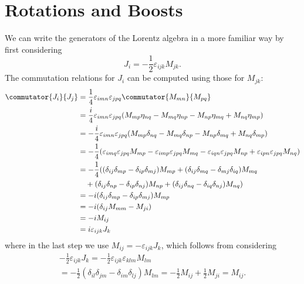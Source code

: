 \documentclass[fleqn]{NotesClass}
\newcommand{\minkowskiMetric}{\eta}
\begin{document}
    \section{Rotations and Boosts}
    We can write the generators of the Lorentz algebra in a more familiar way by first considering 
    \begin{equation}
        J_i = -\frac{1}{2}\varepsilon_{ijk}M_{jk}.
    \end{equation}
    The commutation relations for \(J_i\) can be computed using those for \(M_{jk}\):
    \begin{align}
        \commutator{J_i}{J_j} &= \frac{1}{4} \varepsilon_{imn}\varepsilon_{jpq} \commutator{M_{mn}}{M_{pq}}\\
        &= \frac{i}{4}\varepsilon_{imn}\varepsilon_{jpq} (M_{mp}\minkowskiMetric_{nq} - M_{mq}\minkowskiMetric_{np} - M_{np}\minkowskiMetric_{mq} + M_{nq}\minkowskiMetric_{mp})\\
        &= -\frac{i}{4}\varepsilon_{imn}\varepsilon_{jpq} (M_{mp}\delta_{nq} - M_{mq}\delta_{np} - M_{np}\delta_{mq} + M_{nq}\delta_{mp})\\
        &= -\frac{1}{4}(\varepsilon_{imq}\varepsilon_{jpq}M_{mp} - \varepsilon_{imp}\varepsilon_{jpq}M_{mq} - \varepsilon_{iqn}\varepsilon_{jpq}M_{np} + \varepsilon_{ipn}\varepsilon_{jpq}M_{nq}) \notag\\
        &= -\frac{1}{4}((\delta_{ij}\delta_{mp} - \delta_{ip}\delta_{mj})M_{mp} + (\delta_{ij}\delta_{mq} - \delta_{mj}\delta_{iq})M_{mq}\\
        &\quad+ (\delta_{ij}\delta_{np} - \delta_{ip}\delta_{nj})M_{np} + (\delta_{ij}\delta_{nq} - \delta_{iq}\delta_{nj})M_{nq})\\
        &= -i(\delta_{ij}\delta_{mp} - \delta_{ip}\delta_{mj})M_{mp}\\
        &= -i(\delta_{ij}M_{mm} - M_{ji})\\
        &= -iM_{ij}\\
        &= i\varepsilon_{ijk}J_k
    \end{align}
    where in the last step we use \(M_{ij} = -\varepsilon_{ijk}J_{k}\), which follows from considering
    \begin{multline}
        -\frac{1}{2}\varepsilon_{ijk}J_k = -\frac{1}{2}\varepsilon_{ijk}\varepsilon_{klm}M_{lm}\\
        = -\frac{1}{2}(\delta_{il}\delta_{jm} - \delta_{im}\delta_{lj})M_{lm} = -\frac{1}{2}M_{ij} + \frac{1}{2}M_{ji} = M_{ij}.
    \end{multline}
    
\end{document}
